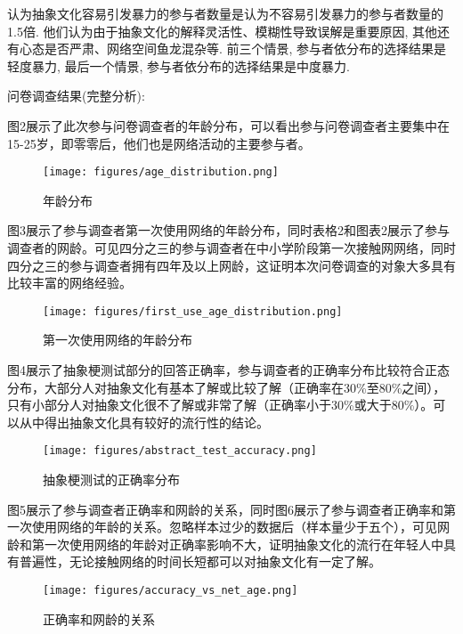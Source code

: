 \documentclass[12pt,a4paper]{ctexart}
\begin{document}
认为抽象文化容易引发暴力的参与者数量是认为不容易引发暴力的参与者数量的1.5倍.
他们认为由于抽象文化的解释灵活性、模糊性导致误解是重要原因, 其他还有心态是否严肃、网络空间鱼龙混杂等.
前三个情景, 参与者依分布的选择结果是轻度暴力, 最后一个情景, 参与者依分布的选择结果是中度暴力.

问卷调查结果(完整分析):

图2展示了此次参与问卷调查者的年龄分布，可以看出参与问卷调查者主要集中在15-25岁，即零零后，他们也是网络活动的主要参与者。

\begin{figure}[htbp]
    \centering
    \texttt{[image: figures/age\_distribution.png]}
    \caption{年龄分布}
    \label{fig:age_distribution}
\end{figure}

图3展示了参与调查者第一次使用网络的年龄分布，同时表格2和图表2展示了参与调查者的网龄。可见四分之三的参与调查者在中小学阶段第一次接触网网络，同时四分之三的参与调查者拥有四年及以上网龄，这证明本次问卷调查的对象大多具有比较丰富的网络经验。

\begin{figure}[htbp]
    \centering
    \texttt{[image: figures/first\_use\_age\_distribution.png]}
    \caption{第一次使用网络的年龄分布}
    \label{fig:first_use_age_distribution}
\end{figure}

图4展示了抽象梗测试部分的回答正确率，参与调查者的正确率分布比较符合正态分布，大部分人对抽象文化有基本了解或比较了解（正确率在30\%至80\%之间），只有小部分人对抽象文化很不了解或非常了解（正确率小于30\%或大于80\%）。可以从中得出抽象文化具有较好的流行性的结论。

\begin{figure}[htbp]
    \centering
    \texttt{[image: figures/abstract\_test\_accuracy.png]}
    \caption{抽象梗测试的正确率分布}
    \label{fig:abstract_test_accuracy}
\end{figure}

图5展示了参与调查者正确率和网龄的关系，同时图6展示了参与调查者正确率和第一次使用网络的年龄的关系。忽略样本过少的数据后（样本量少于五个），可见网龄和第一次使用网络的年龄对正确率影响不大，证明抽象文化的流行在年轻人中具有普遍性，无论接触网络的时间长短都可以对抽象文化有一定了解。

\begin{figure}[htbp]
    \centering
    \texttt{[image: figures/accuracy\_vs\_net\_age.png]}
    \caption{正确率和网龄的关系}
    \label{fig:accuracy_vs_net_age}
\end{figure}
\end{document}
